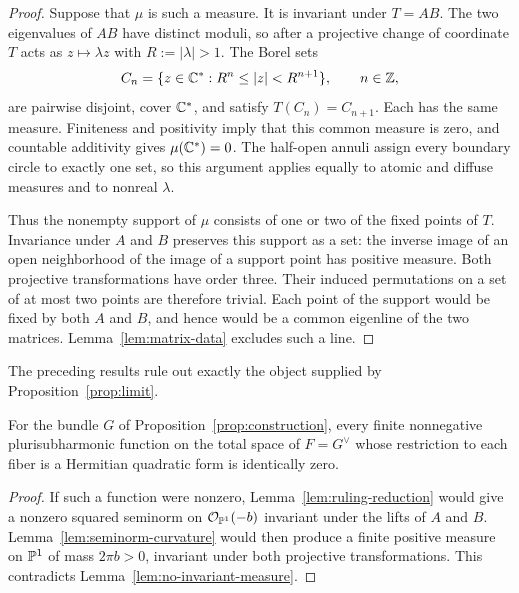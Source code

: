 \begin{proof}
Suppose that $\mu$ is such a measure.  It is invariant under $T=AB$.
The two eigenvalues of $AB$ have distinct moduli, so after a projective
change of coordinate $T$ acts as $z\mapsto\lambda z$ with
$R:=|\lambda|>1$.  The Borel sets
\[
 C_n=\{z\in\mathbb C^*:R^n\leq|z|<R^{n+1}\},\qquad n\in\mathbb Z,
\]
are pairwise disjoint, cover $\mathbb C^*$, and satisfy $T(C_n)=C_{n+1}$.
Each has the same measure.  Finiteness and positivity imply that this
common measure is zero, and countable additivity gives
$\mu(\mathbb C^*)=0$.  The half-open annuli assign every boundary circle to
exactly one set, so this argument applies equally to atomic and diffuse
measures and to nonreal $\lambda$.

Thus the nonempty support of $\mu$ consists of one or two of the fixed
points of $T$.  Invariance under $A$ and $B$ preserves this support as a
set: the inverse image of an open neighborhood of the image of a
support point has positive measure.  Both projective transformations
have order three.  Their induced permutations on a set of at most two
points are therefore trivial.  Each point of the support would be
fixed by both $A$ and $B$, and hence would be a common eigenline of the
two matrices. Lemma~\ref{lem:matrix-data} excludes such a line.
\end{proof}

The preceding results rule out exactly the object supplied by
Proposition~\ref{prop:limit}.

\begin{proposition}
\label{prop:obstruction}
For the bundle $G$ of Proposition~\ref{prop:construction}, every finite
nonnegative plurisubharmonic function on the total space of $F=G^\vee$
whose restriction to each fiber is a Hermitian quadratic form is
identically zero.
\end{proposition}

\begin{proof}
If such a function were nonzero, Lemma~\ref{lem:ruling-reduction}
would give a nonzero squared seminorm on $\mathcal O_{\mathbb P^1}(-b)$ invariant
under the lifts of $A$ and $B$. Lemma~\ref{lem:seminorm-curvature}
would then produce a finite positive measure on $\mathbb P^1$ of mass
$2\pi b>0$, invariant under both projective transformations.
This contradicts Lemma~\ref{lem:no-invariant-measure}.
\end{proof}
